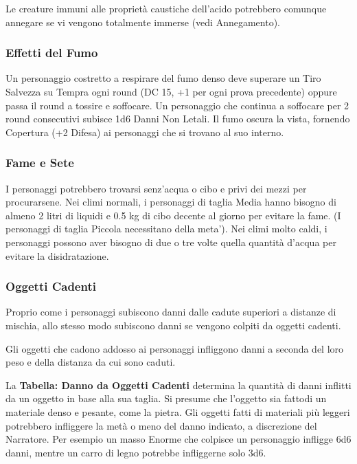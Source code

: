 \documentclass[a4paper,11pt,twoside,openany]{book}
\begin{document}
Le creature immuni alle proprietà caustiche dell'acido potrebbero comunque annegare se vi vengono totalmente immerse (vedi Annegamento).

\subsubsection{Effetti del Fumo}

\label{effetti-del-fumo}

Un personaggio costretto a respirare del fumo denso deve superare un Tiro Salvezza su Tempra ogni round (DC 15, +1 per ogni prova precedente) oppure passa il round a tossire e soffocare. Un personaggio che continua a soffocare per 2 round consecutivi subisce 1d6 Danni Non Letali. Il fumo oscura la vista, fornendo Copertura (+2 Difesa) ai personaggi che si trovano al suo interno.

\subsubsection{Fame e Sete}

\label{fame-e-sete}

I personaggi potrebbero trovarsi senz'acqua o cibo e privi dei mezzi per procurarsene. Nei climi normali, i personaggi di taglia Media hanno bisogno di almeno 2 litri di liquidi e 0.5 kg di cibo decente al giorno per evitare la fame. (I personaggi di taglia Piccola necessitano della meta'). Nei climi molto caldi, i personaggi possono aver bisogno di due o tre volte quella quantità d'acqua per evitare la disidratazione.

\subsubsection{Oggetti Cadenti}

\label{oggetti-cadenti}

Proprio come i personaggi subiscono danni dalle cadute superiori a distanze di mischia, allo stesso modo subiscono danni se vengono colpiti da oggetti cadenti.

Gli oggetti che cadono addosso ai personaggi infliggono danni a seconda del loro peso e della distanza da cui sono caduti.

La \textbf{Tabella: Danno da Oggetti Cadenti} determina la quantità di danni inflitti da un oggetto in base alla sua taglia. Si presume che l'oggetto sia fattodi un materiale denso e pesante, come la pietra.
Gli oggetti fatti di materiali più leggeri potrebbero infliggere la metà o meno del danno indicato, a discrezione del Narratore. Per esempio un masso Enorme che colpisce un personaggio infligge 6d6 danni, mentre un carro di legno potrebbe infliggerne solo 3d6.
\end{document}
